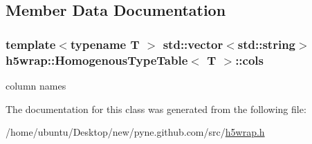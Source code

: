 \subsection{Member Data Documentation}
\subsubsection[{\texorpdfstring{cols}{cols}}]{\setlength{\rightskip}{0pt plus 5cm}template$<$typename T $>$ std\+::vector$<$std\+::string$>$ {\bf h5wrap\+::\+Homogenous\+Type\+Table}$<$ T $>$\+::cols}\hypertarget{classh5wrap_1_1_homogenous_type_table_a8b60fa54475f44bea26caab0137d8507}{}\label{classh5wrap_1_1_homogenous_type_table_a8b60fa54475f44bea26caab0137d8507}
column names 

The documentation for this class was generated from the following file\+:\begin{DoxyCompactItemize}
\item 
/home/ubuntu/\+Desktop/new/pyne.\+github.\+com/src/\hyperlink{h5wrap_8h}{h5wrap.\+h}\end{DoxyCompactItemize}
